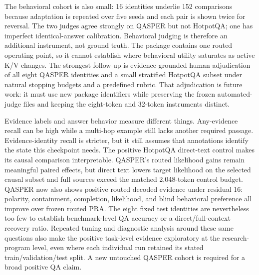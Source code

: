 \documentclass[11pt]{article}
\begin{document}
The behavioral cohort is also small: 16 identities underlie 152 comparisons because adaptation is
repeated over five seeds and each pair is shown twice for reversal. The two judges agree strongly
on QASPER but not HotpotQA; one has imperfect identical-answer calibration. Behavioral judging is
therefore an additional instrument, not ground truth. The package contains one routed operating
point, so it cannot establish where behavioral utility saturates as active K/V changes.
The strongest follow-up is evidence-grounded human adjudication of all eight QASPER identities
and a small stratified HotpotQA subset under natural stopping budgets and a predefined rubric.
That adjudication is future work: it must use new package identifiers while preserving the frozen
automated-judge files and keeping the eight-token and 32-token instruments distinct.

Evidence labels and answer behavior measure different things. Any-evidence recall can be high
while a multi-hop example still lacks another required passage. Evidence-identity recall is
stricter, but it still assumes that annotations identify the state this checkpoint needs. The
positive HotpotQA direct-text control makes its causal comparison interpretable. QASPER's routed
likelihood gains remain meaningful paired effects, but direct text lowers target likelihood on the
selected causal subset and full sources exceed the matched 2,048-token control budget. QASPER now
also shows positive routed decoded evidence under residual 16: polarity, containment, completion,
likelihood, and blind behavioral preference all improve over frozen routed PRA. The eight fixed
test identities are nevertheless too few to establish benchmark-level QA accuracy or a
direct/full-context recovery ratio.
Repeated tuning and diagnostic analysis around these same questions also make the positive
task-level evidence exploratory at the research-program level, even where each individual run
retained its stated train/validation/test split. A new untouched QASPER cohort is required for a
broad positive QA claim.
\end{document}
